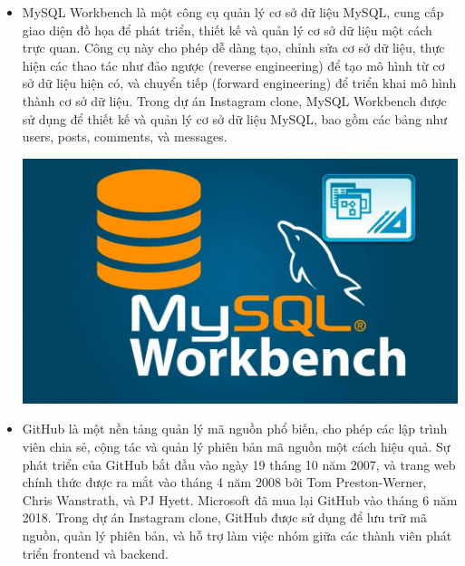 \begin{itemize}
\item MySQL Workbench là một công cụ quản lý cơ sở dữ liệu MySQL, cung cấp giao diện đồ họa để phát triển, thiết kế và quản lý cơ sở dữ liệu một cách trực quan. Công cụ này cho phép dễ dàng tạo, chỉnh sửa cơ sở dữ liệu, thực hiện các thao tác như đảo ngược (reverse engineering) để tạo mô hình từ cơ sở dữ liệu hiện có, và chuyển tiếp (forward engineering) để triển khai mô hình thành cơ sở dữ liệu. Trong dự án Instagram clone, MySQL Workbench được sử dụng để thiết kế và quản lý cơ sở dữ liệu MySQL, bao gồm các bảng như users, posts, comments, và messages.

\includegraphics[width=\textwidth]{img/mysql_workbench.png}
\end{itemize}

\begin{itemize}
\item GitHub là một nền tảng quản lý mã nguồn phổ biến, cho phép các lập trình viên chia sẻ, cộng tác và quản lý phiên bản mã nguồn một cách hiệu quả. Sự phát triển của GitHub bắt đầu vào ngày 19 tháng 10 năm 2007, và trang web chính thức được ra mắt vào tháng 4 năm 2008 bởi Tom Preston-Werner, Chris Wanstrath, và PJ Hyett. Microsoft đã mua lại GitHub vào tháng 6 năm 2018. Trong dự án Instagram clone, GitHub được sử dụng để lưu trữ mã nguồn, quản lý phiên bản, và hỗ trợ làm việc nhóm giữa các thành viên phát triển frontend và backend.
\end{itemize}